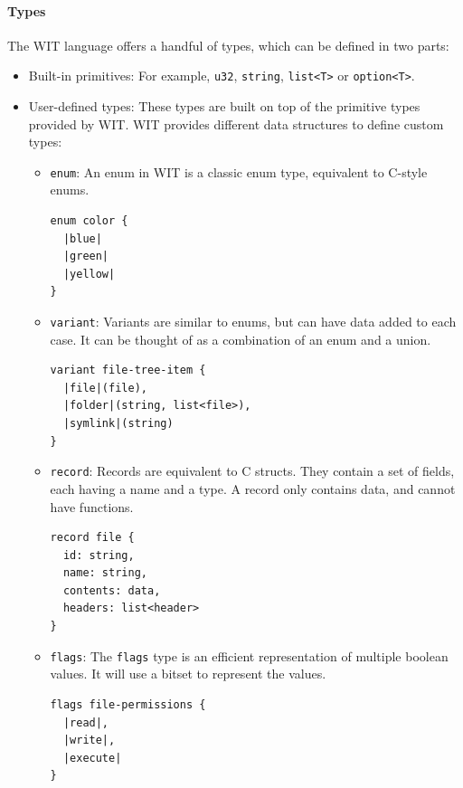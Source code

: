 \paragraph{Types}
The WIT language offers a handful of types, which can be defined in two parts:
\begin{itemize}
\item Built-in primitives: For example, \texttt{u32}, \texttt{string}, \texttt{list<T>} or \texttt{option<T>}.
\item User-defined types: These types are built on top of the primitive types provided by WIT. WIT provides different data structures to define custom types:
\begin{itemize}
\item \texttt{enum}: An enum in WIT is a classic enum type, equivalent to C-style enums.
\begin{lstlisting}[language=wit]
enum color {
  |blue|
  |green|
  |yellow|
}
\end{lstlisting}

\item \texttt{variant}: Variants are similar to enums, but can have data added to each case. It can be thought of as a combination of an enum and a union.
\begin{lstlisting}[language=wit]
variant file-tree-item {
  |file|(file),
  |folder|(string, list<file>),
  |symlink|(string)
}
\end{lstlisting}

\item \texttt{record}: Records are equivalent to C structs. They contain a set of fields, each having a name and a type. A record only contains data, and cannot have functions.
\begin{lstlisting}[language=wit]
record file {
  id: string,
  name: string,
  contents: data,
  headers: list<header>
}
\end{lstlisting}

\item \texttt{flags}: The \texttt{flags} type is an efficient representation of multiple boolean values. It will use a bitset to represent the values.

\begin{lstlisting}[language=wit]
flags file-permissions {
  |read|,
  |write|,
  |execute|
}
\end{lstlisting}

\end{itemize}
\end{itemize}


